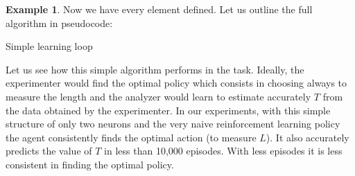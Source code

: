 \documentclass[11pt,a4paper,twoside]{report}
\DeclareMathOperator*{\argmax}{arg\,max}
\newcommand{\+}{\textnormal{+} }
\theoremstyle{definition}
\newtheorem{myex}[mythm]{Example}
\numberwithin{equation}{chapter}
\begin{document}
\begin{myex}
Now we have every element defined. Let us outline the full algorithm in 
pseudocode:

  \makeatletter
  \def\BState{\State\hskip-\ALG@thistlm}
  \makeatother
  \begin{algorithm}
    \caption{Simple learning loop}\label{pendulum}
    \end{algorithm}
\end{myex}

Let us see how this simple algorithm performs in the task. Ideally, the
experimenter would find the optimal policy which consists in choosing always to
measure the length and the analyzer would learn to estimate accurately $T$ from
the data obtained by the experimenter. In our experiments, with this simple
structure of only two neurons and the very naive reinforcement learning policy
the agent consistently finds the optimal action (to measure $L$). It also
accurately predicts the value of $T$ in less than 10,000 episodes. With less
episodes it is less consistent in finding the optimal policy.
\end{document}
